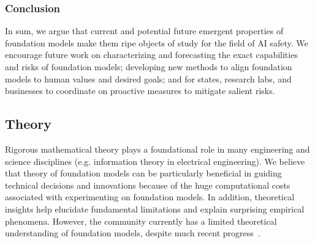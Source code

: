 \subsubsection{Conclusion}
In sum, we argue that current and potential future emergent properties of foundation models make them ripe objects of study for the field of AI safety. We encourage future work on characterizing and forecasting the exact capabilities and risks of foundation models; developing new methods to align foundation models to human values and desired goals; and for states, research labs, and businesses to coordinate on proactive measures to mitigate salient risks.

\newsection
\subsection{Theory}
\label{sec:theory}

\newcommand\lpre{\ensuremath {\ell_{\text{pre}}}}
\newcommand\emppre{\ensuremath {\widehat{L}_{\text{pre}}}}
\newcommand\popadapt{\ensuremath {L_{\text{adapt}}}}
\newcommand\empadapt{\ensuremath {\widehat{L}_{\text{adapt}}}}
\newcommand\poppre{\ensuremath {L_{\text{pre}}}}
\newcommand\datapre{\ensuremath {p_{\text{pre}}}}
\newcommand\trainpre{\ensuremath {\hat{p}_{\text{pre}}}}
\newcommand\datatask{\ensuremath {p_{\text{task}}}}
\newcommand\traintask{\ensuremath {\hat{p}_{\text{task}}}}
\newcommand\thetaum{\ensuremath {\hat{\theta}_{\textup{FM}}}}
\newcommand\gammatask{\ensuremath {\gamma_{\text{task}}}}
\newcommand\ladapt{\ensuremath {\ell_{\text{adapt}}}}
\newcommand\poptest{\ensuremath {L_\text{task}}}

Rigorous mathematical theory plays a foundational role in many engineering and science disciplines (e.g. information theory in electrical engineering). We believe that theory of foundation models can be particularly beneficial in guiding technical decisions and innovations because of the huge computational costs associated with experimenting on foundation models. In addition, theoretical insights help elucidate fundamental limitations and explain surprising empirical phenomena. However, the community currently has a limited theoretical understanding of foundation models, despite much recent progress~\cite{arora2019theoretical,haochen2021spectral,wei2021pretrained,wei2020theoretical,zhang2021inductive,saunshi2020mathematical,dao2019kernel,tosh2020contrastive,tosh2021contrastive,cai2021theory,lee2020predicting,zimmermann2021contrastive,bansal2020self,wang2020understanding,tsai2020self,tian2020makes,tian2020understanding, tripuraneni2020theory,du2020fewshot}. 

